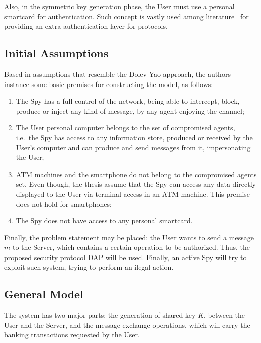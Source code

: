 Also, in the symmetric key generation phase, the User must use a personal smartcard for authentication. Such concept is vastly used among literature~\cite{ShoupRubin96} for providing an extra authentication layer for protocols.



\subsection{Initial Assumptions}
Based in assumptions that resemble the Dolev-Yao approach, the authors instance some basic premises for constructing the model, as follows:

\begin{enumerate}
  \item The Spy has a full control of the network, being able to intercept, block, produce or inject any kind of message, by any agent enjoying the channel;

  \item The User personal computer belongs to the set of compromised agents, i.e.\ the Spy has access to any information store, produced or received by the User's computer and can produce and send messages from it, impersonating the User;

  \item ATM machines and the smartphone do not belong to the compromised agents set. Even though, the thesis assume that the Spy can access any data directly displayed to the User via terminal access in an ATM machine. This premise does not hold for smartphones;

  \item The Spy does not have access to any personal smartcard.
\end{enumerate}

Finally, the problem statement may be placed: the User wants to send a message \(m\) to the Server, which contains a certain operation to be authorized. Thus, the proposed security protocol DAP will be used. Finally, an active Spy will try to exploit such system, trying to perform an ilegal action.



\subsection{General Model}
The system has two major parts: the generation of shared key $K$, between the User and the Server, and the message exchange operations, which will carry the banking transactions requested by the User.

